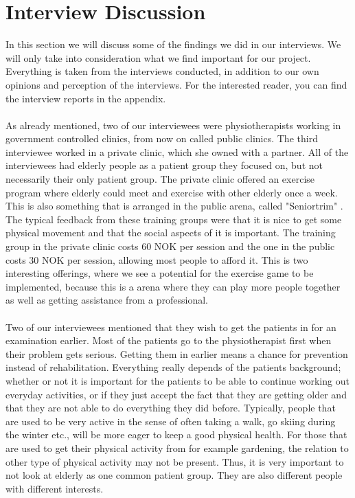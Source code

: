 \section{Interview Discussion}
In this section we will discuss some of the findings we did in our interviews. We will only take into consideration what we find important for our project. Everything is taken from the interviews conducted, in addition to our own opinions and perception of the interviews. For the interested reader, you can find the interview reports in the appendix.\\ \\
As already mentioned, two of our interviewees were physiotherapists working in government controlled clinics, from now on called public clinics. The third interviewee worked in a private clinic, which she owned with a partner. All of the interviewees had elderly people as a patient group they focused on, but not necessarily their only patient group. The private clinic offered an exercise program where elderly could meet and exercise with other elderly once a week. This is also something that is arranged in the public arena, called "Seniortrim" \cite{trim}. The typical feedback from these training groups were that it is nice to get some physical movement and that the social aspects of it is important. The training group in the private clinic costs 60 NOK per session and the one in the public costs 30 NOK per session, allowing most people to afford it. This is two interesting offerings, where we see a potential for the exercise game to be implemented, because this is a arena where they can play more people together as well as getting assistance from a professional. \\ \\
Two of our interviewees mentioned that they wish to get the patients in for an examination earlier. Most of the patients go to the physiotherapist first when their problem gets serious. Getting them in earlier means a chance for prevention instead of rehabilitation. Everything really depends of the patients background; whether or not it is important for the patients to be able to continue working out everyday activities, or if they just accept the fact that they are getting older and that they are not able to do everything they did before. Typically, people that are used to be very active in the sense of often taking a walk, go skiing during the winter etc., will be more eager to keep a good physical health. For those that are used to get their physical activity from for example gardening, the relation to other type of physical activity may not be present. Thus, it is very important to not look at elderly as one common patient group. They are also different people with different interests.\\ \\

